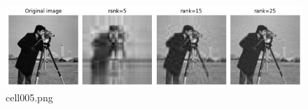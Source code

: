 \begin{figure}[ht]
	\centering
	\includegraphics[scale=0.8, max width=\linewidth]{./fig/solve-credit-assignment-problem/linear-network-learning-dynamics/cell005.png}
	\caption{cell005.png}
	\label{cell005.png}
\end{figure}